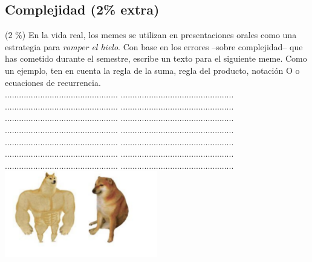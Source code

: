 \documentclass[10 pt]{article}
\begin{document}
\begin{multicols}{2}
\section{Complejidad (2\% extra)}
 (2 \%) En la vida real, los memes se utilizan en presentaciones orales como una estrategia para \textit{romper el hielo}. Con base en los errores --sobre complejidad-- que has cometido durante el semestre,
escribe un texto para el siguiente meme. Como un ejemplo, ten en cuenta la regla de la suma, regla del producto,
notación O o ecuaciones de recurrencia.\\
................................................     ................................................\\
................................................     ................................................\\
................................................     ................................................\\
................................................     ................................................\\
................................................     ................................................\\
................................................     ................................................\\
................................................     ................................................\\
\includegraphics[width=0.5\textwidth]{perritos.png}





\end{multicols}
\end{document}
